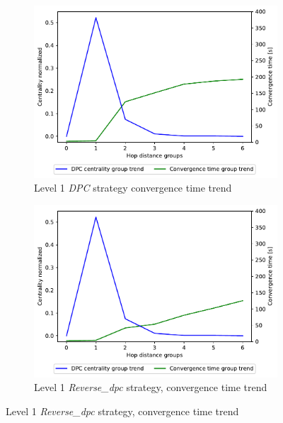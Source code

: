 \documentclass[10pt,conference,letterpaper]{IEEEtran}
\newcommand{\figwidth}{0.78}
\begin{document}
\begin{figure}[tb]
	\centering

	\begin{subfigure}{.49\columnwidth}
		\centering
		\includegraphics[width=\figwidth\columnwidth]{images/different_levels/1000-DPC-l0_node-conv_MRAI30_centVStime_trend.pdf}
		\caption{Level 1 \textit{DPC} strategy convergence time trend}
		\label{fig:1000-dpc-time-trend-level1}
	\end{subfigure}
	\hfill
	\begin{subfigure}{.49\columnwidth}
		\centering
		\includegraphics[width=\figwidth\columnwidth]{images/different_levels/1000-reverse_dpc-l0_node-conv_MRAI30_centVStime_trend.pdf}
		\caption{Level 1 \textit{Reverse\_dpc} strategy, convergence time trend}
		\label{fig:1000-reverse-dpc-time-trend-level1}
	\end{subfigure}


\end{figure}
\end{document}
